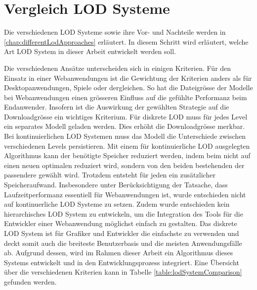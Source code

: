 \section{Vergleich LOD Systeme}
Die verschiedenen LOD Systeme sowie ihre Vor- und Nachteile werden in \autoref{chap:differentLodApproaches} erläutert. In diesem Schritt wird erläutert, welche Art LOD System in dieser Arbeit entwickelt werden soll.

Die verschiedenen Ansätze unterscheiden sich in einigen Kriterien. Für den Einsatz in einer Webanwendungen ist die Gewichtung der Kriterien anders als für Desktopanwendungen, Spiele oder dergleichen.
So hat die Dateigrösse der Modelle bei Webanwendungen einen grösseren Einfluss auf die gefühlte Performanz beim Endanwender. Insofern ist die Auswirkung der gewählten Strategie auf die Downloadgrösse ein wichtiges Kriterium. Für diskrete LOD muss für jedes Level ein separates Modell geladen werden. Dies erhöht die Downloadgrösse merkbar. Bei kontinuierlichen LOD Systemen muss das Modell die Unterschiede zwischen verschiedenen Levels persistieren. Mit einem für kontinuierliche LOD ausgelegten Algorithmus kann der benötigte Speicher reduziert werden, indem beim  nicht auf einen neuen optimalen  reduziert wird, sondern von den beiden bestehenden  der passendere gewählt wird. Trotzdem entsteht für jeden  ein zusätzlicher Speicheraufwand.
Insbesondere unter Berücksichtigung der Tatsache, dass Laufzeitperformanz essentiell für Webanwendungen ist, wurde entschieden nicht auf kontinuerliche LOD Systeme zu setzen.
Zudem wurde entschieden kein hierarchisches LOD System zu entwickeln, um die Integration des Tools für die Entwickler einer Webanwendung möglichst einfach zu gestalten.
Das diskrete LOD System ist für Grafiker und Entwickler die einfachste zu verwenden und deckt somit auch die breiteste Benutzerbasis und die meisten Anwendungsfälle ab. Aufgrund dessen, wird im Rahmen dieser Arbeit ein Algorithmus dieses Systems entwickelt und in den Entwicklungsprozess integriert.
Eine Übersicht über die verschiedenen Kriterien kann in Tabelle \ref{table:lodSystemComparison} gefunden werden.

